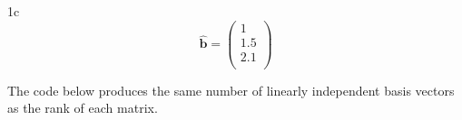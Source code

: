 \documentclass{article}
\begin{document}
\begin{homeworkProblem}
\begin{homeworkSection}{1c}
        \begin{equation*}
        \hat{\bm{b}} = \left(\begin{matrix} 1\\1.5\\2.1\\\end{matrix}\right)
        \end{equation*}


    \end{homeworkSection}

\end{homeworkProblem}

\begin{homeworkProblem}


\end{homeworkProblem}

\begin{homeworkProblem}

    The code below produces the same number of linearly independent basis
    vectors as the rank of each matrix.


\end{homeworkProblem}
\end{document}
